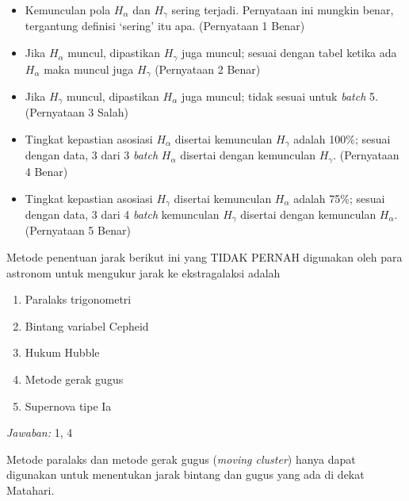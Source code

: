\documentclass[11pt,fleqn]{exam}
\begin{document}
\begin{questions}
\begin{itemize}
    \item Kemunculan pola  $H_{\alpha}$ dan $H_{\gamma}$ sering terjadi. Pernyataan ini mungkin  benar, tergantung definisi `sering' itu apa. (Pernyataan 1 Benar)
    \item Jika $H_{\alpha}$ muncul, dipastikan $H_{\gamma}$ juga muncul; sesuai dengan tabel ketika ada $H_{\alpha}$ maka muncul juga $H_{\gamma}$ (Pernyataan 2 Benar)
    \item Jika $H_{\gamma}$ muncul, dipastikan $H_{\alpha}$ juga muncul; tidak sesuai untuk \textit{batch} 5. (Pernyataan 3 Salah)
    \item Tingkat kepastian asosiasi $H_{\alpha}$ disertai kemunculan $H_{\gamma}$ adalah 100\%; sesuai dengan data, 3 dari 3 \textit{batch} $H_{\alpha}$ disertai dengan kemunculan $H_{\gamma}$. (Pernyataan 4 Benar)
    \item Tingkat kepastian asosiasi $H_{\gamma}$ disertai kemunculan $H_{\alpha}$ adalah 75\%; sesuai dengan data, 3 dari 4 \textit{batch} kemunculan $H_{\gamma}$ disertai dengan kemunculan $H_{\alpha}$. (Pernyataan 5 Benar)
\end{itemize}

\vspace{0.5cm}
\question Metode penentuan jarak berikut ini yang TIDAK PERNAH digunakan oleh para astronom untuk mengukur jarak ke ekstragalaksi adalah
\begin{enumerate}
    \item Paralaks trigonometri
    \item Bintang variabel Cepheid
    \item Hukum Hubble
    \item Metode gerak gugus
    \item Supernova tipe Ia
\end{enumerate}

\bigskip
\textit{Jawaban: } 1, 4

Metode paralaks dan metode gerak gugus (\textit{moving cluster}) hanya dapat digunakan untuk menentukan jarak bintang dan gugus yang ada di dekat Matahari.



\end{questions}
\end{document}
